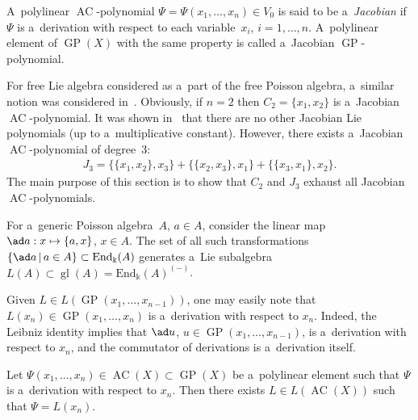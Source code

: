 \begin{definition}
A~polylinear $\operatorname{AC}$-polynomial $\Psi=\Psi(x_1,\dots, x_n)\in V_0$ is said to be a~{\em Jacobian} if~$\Psi $ is a~derivation
with respect to each variable~$x_i$, $i=1,\dots, n$.
A~polylinear element of $\operatorname{GP}(X)$ with the same property is called a~Jacobian $\operatorname{GP}$-polynomial.
\end{definition}

For free Lie algebra considered as a~part of the free Poisson algebra, a~similar notion was considered
in~\cite{FarkasI}.
Obviously, if $n=2$ then $C_2=\{x_1,x_2\}$ is a~Jacobian $\operatorname{AC}$-polynomial.
It was shown in~\cite{FarkasI} that there are no other Jacobian Lie polynomials (up to a~multiplicative constant).
However, there exists a~Jacobian $\operatorname{AC}$-polynomial of degree~3:
\begin{gather*}
J_3 =\{\{x_1,x_2\},x_3\} + \{\{x_2,x_3\},x_1\} + \{\{x_3,x_1\},x_2\}.
\end{gather*}
The main purpose of this section is to show that $C_2$ and $J_3$ exhaust all Jacobian $\operatorname{AC}$-polynomials.

For a~generic Poisson algebra~$A$, $a\in A$, consider the linear map $\ad a: x\mapsto \{a,x\}$, $x\in A$.
The set of all such transformations $\{\ad a\,|\, a\in A\}\subset \mathrm{End}_{\Bbbk}(A)$ generates a~Lie
subalgebra $L(A)\subset \operatorname{gl} (A) = \mathrm{End}_{\Bbbk}(A)^{(-)}$.

Given $L\in L(\operatorname{GP}(x_1,\dots, x_{n-1}))$, one may easily note that $L(x_n)\in \operatorname{GP}(x_1,\dots, x_{n})$ is a~derivation with
respect to $x_n$.
Indeed, the Leibniz identity implies that $\ad u$, $u\in \operatorname{GP}(x_1,\dots, x_{n-1})$, is a~derivation with respect
to $x_n$, and the commutator of derivations is a~derivation itself.

\begin{lemma}
\label{lem:1Der_one_var}
Let $\Psi(x_1,\dots, x_n) \in \operatorname{AC}(X)\subset \operatorname{GP}(X)$ be a~polylinear element such that $\Psi $ is a~derivation with respect
to $x_n$.
Then there exists $L\in L(\operatorname{AC}(X))$ such that $\Psi = L(x_n)$.
\end{lemma}

